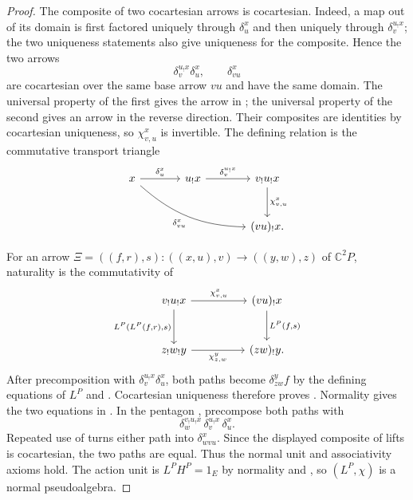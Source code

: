 \documentclass[11pt]{article}
\theoremstyle{plain}
\theoremstyle{definition}
\theoremstyle{remark}
\newcommand{\C}{\mathbb{C}}
\numberwithin{equation}{section}
\begin{document}
\begin{proof}
The composite of two cocartesian arrows is cocartesian.  Indeed, a map
out of its domain is first factored uniquely through $\delta^x_u$ and
then uniquely through $\delta^{u_!x}_v$; the two uniqueness statements
also give uniqueness for the composite.  Hence the two arrows
\begin{equation*}
  \delta^{u_!x}_{v}\delta^x_u,
  \qquad
  \delta^x_{vu}
\end{equation*}
are cocartesian over the same base arrow $vu$ and have the same domain.
The universal property of the first gives the arrow in
; the universal property of the second
gives an arrow in the reverse direction.  Their composites are
identities by cocartesian uniqueness, so $\chi^x_{v,u}$ is invertible.
The defining relation is the commutative transport triangle
\begin{equation}
\begin{tikzcd}[column sep=large,row sep=large]
x \arrow[r,"\delta^x_u"]
  \arrow[drr,bend right=20,"\delta^x_{vu}"']
& u_!x \arrow[r,"\delta^{u_!x}_v"]
& v_!u_!x \arrow[d,"{\chi^x_{v,u}}"] \\
&& (vu)_!x .
\end{tikzcd}
\label{eq:cleavage-compositor-triangle}
\end{equation}

For an arrow
$\Xi=((f,r),s)\colon((x,u),v)\to((y,w),z)$ of $\C^2P$, naturality is
the commutativity of
\begin{equation}
\begin{tikzcd}[column sep=huge,row sep=large]
v_!u_!x \arrow[r,"\chi^x_{v,u}"]
  \arrow[d,"{L^P(L^P(f,r),s)}"']
& (vu)_!x \arrow[d,"{L^P(f,s)}"] \\
z_!w_!y \arrow[r,"\chi^y_{z,w}"']
& (zw)_!y .
\end{tikzcd}
\label{eq:cleavage-compositor-naturality}
\end{equation}
After precomposition with
$\delta^{u_!x}_v\delta^x_u$, both paths become
$\delta^y_{zw}f$ by the defining equations of $L^P$ and
.  Cocartesian uniqueness
therefore proves .  Normality gives the
two equations in .  In the pentagon
, precompose both paths with
\begin{equation*}
  \delta^{v_!u_!x}_w\,
  \delta^{u_!x}_v\,
  \delta^x_u.
\end{equation*}
Repeated use of
 turns either path into
$\delta^x_{wvu}$.  Since the displayed composite of lifts is
cocartesian, the two paths are equal.  Thus the normal unit and
associativity axioms hold.  The action unit is
$L^PH^P=1_E$ by normality and , so
$(L^P,\chi)$ is a normal pseudoalgebra.
\end{proof}
\end{document}
